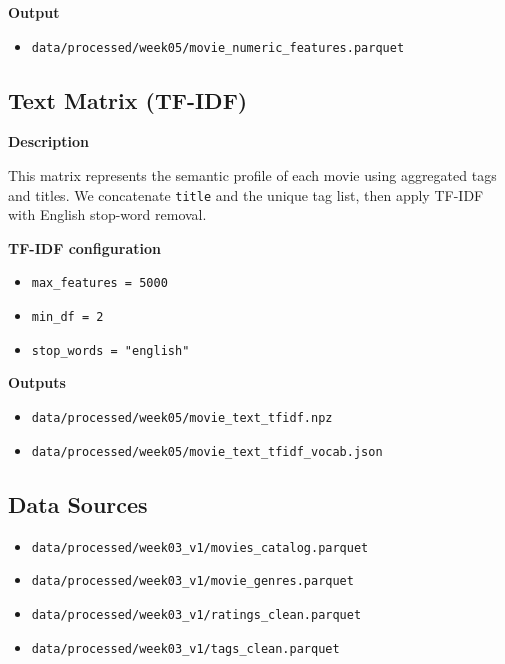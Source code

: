 \documentclass[11pt]{article}
\begin{document}
\textbf{Output}

\begin{itemize}[leftmargin=1.5em]
    \item \texttt{data/processed/week05/movie\_numeric\_features.parquet}
\end{itemize}

\subsection{Text Matrix (TF-IDF)}

\textbf{Description}

This matrix represents the semantic profile of each movie using aggregated tags and titles. We concatenate \texttt{title} and the unique tag list, then apply TF-IDF with English stop-word removal.

\textbf{TF-IDF configuration}

\begin{itemize}[leftmargin=1.5em]
    \item \texttt{max\_features = 5000}
    \item \texttt{min\_df = 2}
    \item \texttt{stop\_words = "english"}
\end{itemize}

\textbf{Outputs}

\begin{itemize}[leftmargin=1.5em]
    \item \texttt{data/processed/week05/movie\_text\_tfidf.npz}
    \item \texttt{data/processed/week05/movie\_text\_tfidf\_vocab.json}
\end{itemize}

\subsection{Data Sources}

\begin{itemize}[leftmargin=1.5em]
    \item \texttt{data/processed/week03\_v1/movies\_catalog.parquet}
    \item \texttt{data/processed/week03\_v1/movie\_genres.parquet}
    \item \texttt{data/processed/week03\_v1/ratings\_clean.parquet}
    \item \texttt{data/processed/week03\_v1/tags\_clean.parquet}
\end{itemize}
\end{document}
